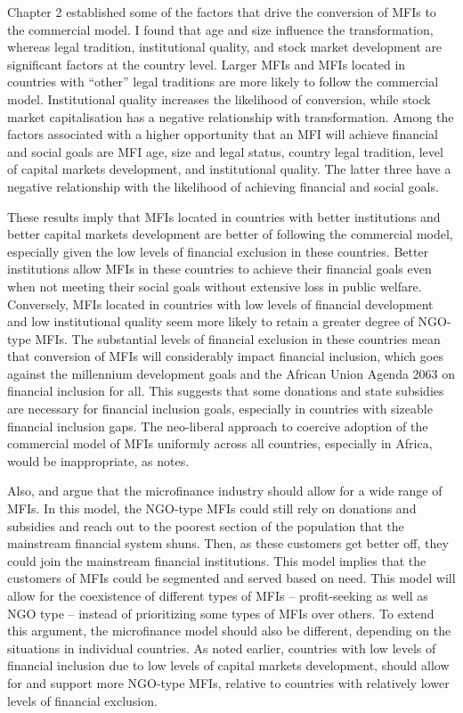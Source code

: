\documentclass[a4paper, nobind]{templates/ociamthesis}
\begin{document}
Chapter 2 established some of the factors that drive the conversion of MFIs to the commercial model. I found that age and size influence the transformation, whereas legal tradition, institutional quality, and stock market development are significant factors at the country level. Larger MFIs and MFIs located in countries with ``other'' legal traditions are more likely to follow the commercial model. Institutional quality increases the likelihood of conversion, while stock market capitalisation has a negative relationship with transformation. Among the factors associated with a higher opportunity that an MFI will achieve financial and social goals are MFI age, size and legal status, country legal tradition, level of capital markets development, and institutional quality. The latter three have a negative relationship with the likelihood of achieving financial and social goals.

These results imply that MFIs located in countries with better institutions and better capital markets development are better of following the commercial model, especially given the low levels of financial exclusion in these countries. Better institutions allow MFIs in these countries to achieve their financial goals even when not meeting their social goals without extensive loss in public welfare. Conversely, MFIs located in countries with low levels of financial development and low institutional quality seem more likely to retain a greater degree of NGO-type MFIs. The substantial levels of financial exclusion in these countries mean that conversion of MFIs will considerably impact financial inclusion, which goes against the millennium development goals and the African Union Agenda 2063 on financial inclusion for all. This suggests that some donations and state subsidies are necessary for financial inclusion goals, especially in countries with sizeable financial inclusion gaps. The neo-liberal approach to coercive adoption of the commercial model of MFIs uniformly across all countries, especially in Africa, would be inappropriate, as \textcite{bateman2010doesn} notes.

Also, \textcite{morduch1999microfinance} and \textcite{morduch2000microfinance} argue that the microfinance industry should allow for a wide range of MFIs. In this model, the NGO-type MFIs could still rely on donations and subsidies and reach out to the poorest section of the population that the mainstream financial system shuns. Then, as these customers get better off, they could join the mainstream financial institutions. This model implies that the customers of MFIs could be segmented and served based on need. This model will allow for the coexistence of different types of MFIs -- profit-seeking as well as NGO type -- instead of prioritizing some types of MFIs over others. To extend this argument, the microfinance model should also be different, depending on the situations in individual countries. As noted earlier, countries with low levels of financial inclusion due to low levels of capital markets development, should allow for and support more NGO-type MFIs, relative to countries with relatively lower levels of financial exclusion.
\end{document}
